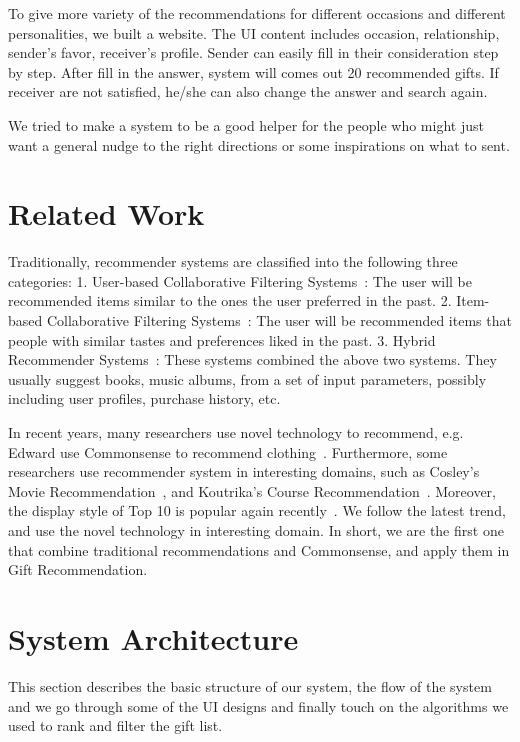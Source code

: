 \documentclass[11pt,twocolumn]{article}
\begin{document}
To give more variety of the recommendations for different occasions and different personalities, we built a website.   The UI content includes occasion, relationship, sender's favor, receiver's profile. 
Sender can easily fill in their consideration step by step. 
After fill in the answer, system will comes out 20 recommended gifts.  If receiver are not satisfied, he/she can also change the answer and search again.

We tried to make a system to be a good helper for the people who might just want a general nudge to the right directions or some inspirations on what to sent.  

\section{Related Work}
Traditionally, recommender systems are classified into the following three categories: 
1. User-based Collaborative Filtering Systems~\cite{Herlocker}:
The user will be recommended items similar to the ones the user preferred in the past.
2. Item-based Collaborative Filtering Systems~\cite{Sarwar, Linden}:
The user will be recommended items that people with similar tastes and preferences liked in the past.
3. Hybrid Recommender Systems~\cite{Bruke}:
These systems combined the above two systems.
They usually suggest books, music albums, from a set of input parameters, possibly including user profiles, purchase history, etc.

In recent years, many researchers use novel technology to recommend, e.g. Edward use Commonsense to recommend clothing~\cite{Shen}.   Furthermore, some researchers use recommender system in interesting domains, such as Cosley’s Movie Recommendation~\cite{Cosley}, and Koutrika’s Course Recommendation~\cite{Koutrika}.   Moreover, the display style of Top 10 is popular again recently~\cite{Deutch}. We follow the latest trend, and use the novel technology in interesting domain.   In short, we are the first one that combine traditional recommendations and Commonsense, and apply them in Gift Recommendation.


\section{System Architecture}

This section describes the basic structure of our system, the flow of the system and we go through some of the UI designs and finally touch on the algorithms we used to rank and filter the gift list.
\end{document}
